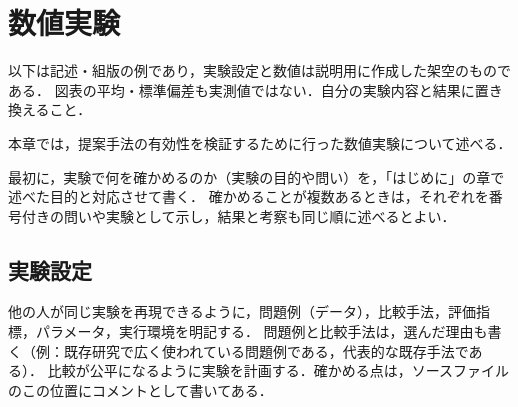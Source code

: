 \chapter{数値実験}
\label{chap:experiments}

\begin{writingnote}
以下は記述・組版の例であり，実験設定と数値は説明用に作成した架空のものである．
図表の平均・標準偏差も実測値ではない．自分の実験内容と結果に置き換えること．
\end{writingnote}

本章では，提案手法の有効性を検証するために行った数値実験について述べる．
\begin{writingnote}
最初に，実験で何を確かめるのか（実験の目的や問い）を，「はじめに」の章で述べた目的と対応させて書く．
確かめることが複数あるときは，それぞれを番号付きの問いや実験として示し，結果と考察も同じ順に述べるとよい．
\end{writingnote}

\section{実験設定}
\label{sec:setup}

\begin{writingnote}
他の人が同じ実験を再現できるように，問題例（データ），比較手法，評価指標，パラメータ，実行環境を明記する．
問題例と比較手法は，選んだ理由も書く（例：既存研究で広く使われている問題例である，代表的な既存手法である）．
比較が公平になるように実験を計画する．確かめる点は，ソースファイルのこの位置にコメントとして書いてある．
\end{writingnote}



